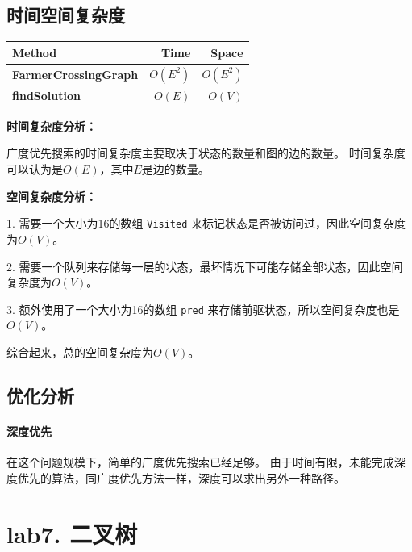 \documentclass[UTF8]{ctexart}
\begin{document}
\subsection*{时间空间复杂度}

\begin{center}
    \begin{tabular}{|l|r|r|} \hline
        Method & Time & Space \\\hline
        \textbf{FarmerCrossingGraph} & $O(E^2)$ & $O(E^2)$ \\
        \textbf{findSolution} & $O(E)$ & $O(V)$ \\ \hline
    \end{tabular}
\end{center}

\textbf{时间复杂度分析：}

广度优先搜索的时间复杂度主要取决于状态的数量和图的边的数量。
时间复杂度可以认为是$O(E)$，其中$E$是边的数量。

\textbf{空间复杂度分析：}

1. 需要一个大小为16的数组 \texttt{Visited} 来标记状态是否被访问过，因此空间复杂度为$O(V)$。

2. 需要一个队列来存储每一层的状态，最坏情况下可能存储全部状态，因此空间复杂度为$O(V)$。

3. 额外使用了一个大小为16的数组 \texttt{pred} 来存储前驱状态，所以空间复杂度也是$O(V)$。

综合起来，总的空间复杂度为$O(V)$。

\subsection*{优化分析}
\paragraph*{深度优先}
在这个问题规模下，简单的广度优先搜索已经足够。
由于时间有限，未能完成深度优先的算法，同广度优先方法一样，深度可以求出另外一种路径。

\newpage
\section*{lab7. 二叉树}
\end{document}
